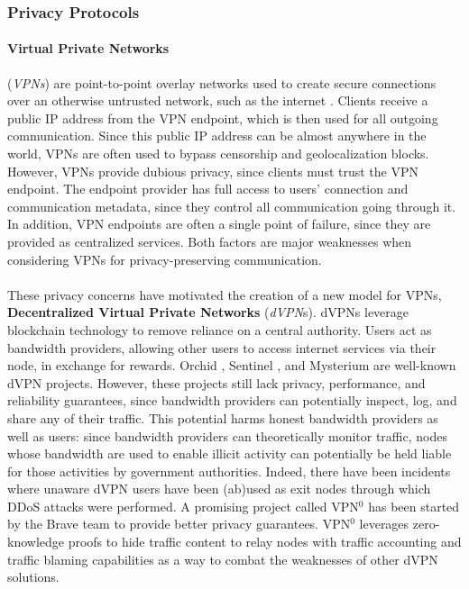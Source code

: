 \subsubsection{Privacy Protocols}
\label{sec:privacyprotocols}

\paragraph{Virtual Private Networks}(\textit{VPNs}) are point-to-point
overlay networks used to create secure connections over an otherwise
untrusted network, such as the internet \cite{venkateswaran_2001}. Clients receive a public IP address from the VPN endpoint, which is then used
for all outgoing communication. Since this public IP address can be almost anywhere in the world, VPNs are often
used to bypass censorship \cite{hobbs_roberts_2018} and geolocalization blocks. However, VPNs provide dubious privacy, since clients must trust the VPN
endpoint. The endpoint provider has full access to users' connection and
communication metadata, since they control all communication going through it. In addition, VPN
endpoints are often a single point of failure, since they are provided as
centralized services. Both factors are major weaknesses when
considering VPNs for privacy-preserving communication.
\\~\\These privacy concerns have motivated the creation of a new model for VPNs,
\textbf{Decentralized Virtual Private Networks} (\textit{dVPN}s). dVPNs leverage blockchain technology to remove reliance on a central authority. Users act as bandwidth providers, allowing other users to access internet services via their node, in exchange for rewards. Orchid \cite{orchid},
Sentinel \cite{sentinel}, and Mysterium \cite{mysterium} are well-known dVPN
projects. However, these projects still lack privacy, performance, and
reliability guarantees, since bandwidth providers can potentially inspect, log, and share any of their traffic. This potential harms honest bandwidth providers as well as users: since bandwidth providers can theoretically monitor traffic, nodes whose bandwidth are used to enable illicit activity can potentially be held liable for those activities by government authorities. Indeed, there have been incidents where
unaware dVPN users have been (ab)used as exit nodes through which DDoS attacks
were performed. A promising project called VPN$^0$
\cite{vpn0} has been started by the Brave team to provide better privacy
guarantees. VPN$^0$ leverages zero-knowledge proofs to hide traffic content to relay
nodes with traffic accounting and traffic blaming capabilities as a way to
combat the weaknesses of other dVPN solutions.

